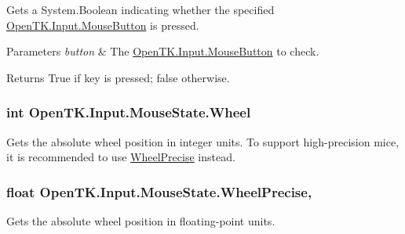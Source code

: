 Gets a System.\-Boolean indicating whether the specified \hyperlink{namespace_open_t_k_1_1_input_a2f6f4de1a952f42570d2e06fd15b5774}{Open\-T\-K.\-Input.\-Mouse\-Button} is pressed. 


\begin{DoxyParams}{Parameters}
{\em button} & The \hyperlink{namespace_open_t_k_1_1_input_a2f6f4de1a952f42570d2e06fd15b5774}{Open\-T\-K.\-Input.\-Mouse\-Button} to check.\\
\hline
\end{DoxyParams}
\begin{DoxyReturn}{Returns}
True if key is pressed; false otherwise.
\end{DoxyReturn}
\hypertarget{struct_open_t_k_1_1_input_1_1_mouse_state_ab490a682925a6ddd972eb41cab4714d5}{
\subsubsection[{Wheel}]{\setlength{\rightskip}{0pt plus 5cm}int Open\-T\-K.\-Input.\-Mouse\-State.\-Wheel\hspace{0.3cm}{\ttfamily [get]}}}\label{struct_open_t_k_1_1_input_1_1_mouse_state_ab490a682925a6ddd972eb41cab4714d5}


Gets the absolute wheel position in integer units. To support high-\/precision mice, it is recommended to use \hyperlink{struct_open_t_k_1_1_input_1_1_mouse_state_a7cccb024aeef61d35a151f97e63e9523}{Wheel\-Precise} instead. 

\hypertarget{struct_open_t_k_1_1_input_1_1_mouse_state_a7cccb024aeef61d35a151f97e63e9523}{
\subsubsection[{Wheel\-Precise}]{\setlength{\rightskip}{0pt plus 5cm}float Open\-T\-K.\-Input.\-Mouse\-State.\-Wheel\-Precise\hspace{0.3cm}{\ttfamily [get]}, {\ttfamily [set]}}}\label{struct_open_t_k_1_1_input_1_1_mouse_state_a7cccb024aeef61d35a151f97e63e9523}


Gets the absolute wheel position in floating-\/point units. 

